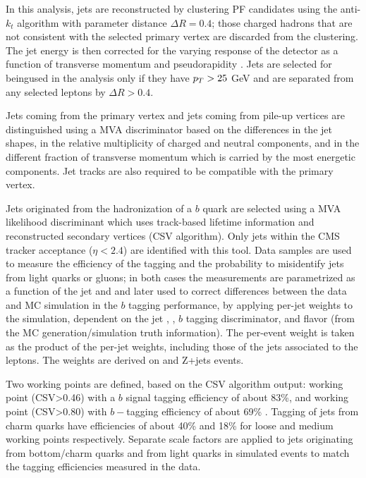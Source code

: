 In this analysis, jets are reconstructed by clustering PF candidates using the anti-$k_t$ algorithm with parameter distance $\Delta R=0.4$; those charged hadrons that are not consistent with the selected primary vertex are discarded from the clustering. The jet energy is then corrected for the varying response of the detector as a function of transverse momentum \pt and pseudorapidity \etac. Jets are selected for beingused in the analysis only if they have $p_T > 25$ GeV and are separated from any selected leptons by $\Delta R > 0.4$.

Jets coming from the primary vertex and jets coming from pile-up vertices are distinguished using a MVA discriminator based on the differences in the jet shapes, in the relative multiplicity of charged and neutral components, and in the different fraction of transverse momentum which is carried by the most energetic components. Jet tracks are also required to be compatible with the primary
vertex.

Jets originated from the hadronization of a $b$ quark are selected using a MVA likelihood discriminant which uses track-based lifetime information and reconstructed secondary vertices (CSV algorithm). Only jets within the CMS tracker acceptance ($\eta < 2.4$) are identified with this tool. Data samples are used to measure the efficiency of the \bjet tagging and the probability to misidentify jets from light quarks or gluons; in both cases the measurements are parametrized as a function of the jet \pt and \etac and later used to correct differences between the data and MC simulation in the $b$ tagging performance, by applying per-jet weights to the simulation, dependent on the jet \pt, \etac, $b$ tagging discriminator, and flavor (from the MC generation/simulation truth information)\cite{btag_corr}. The per-event weight is taken as the product of the per-jet weights, including those of the jets associated to the leptons. The weights are derived on \ttbar and Z+jets events.

Two working points are defined, based on the CSV algorithm output:  working point (CSV>0.46) with a $b$ signal tagging efficiency of about 83\%, and  working point (CSV>0.80) with $b-$tagging efficiency of about 69\% \cite{btag_points}. Tagging of jets from charm quarks have efficiencies of about 40\%  and 18\% for loose and medium working points respectively. Separate scale factors are applied to jets originating from bottom/charm quarks and from light quarks in simulated events to match the tagging efficiencies measured in the data.


